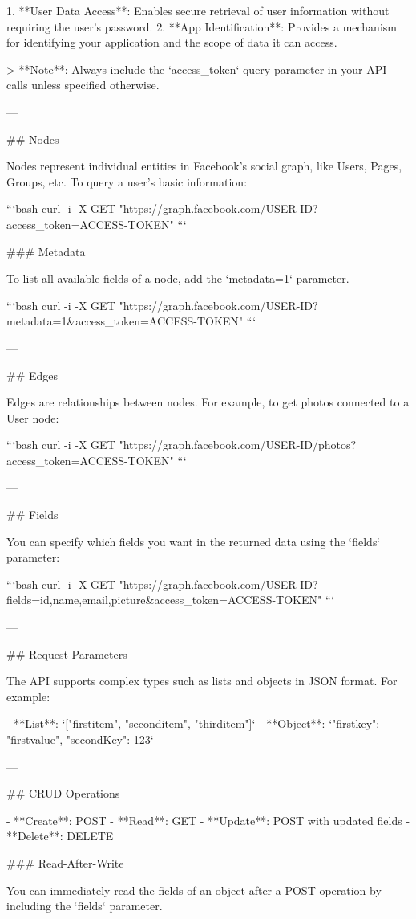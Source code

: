 1. **User Data Access**: Enables secure retrieval of user information without requiring the user's password.
2. **App Identification**: Provides a mechanism for identifying your application and the scope of data it can access.

> **Note**: Always include the `access_token` query parameter in your API calls unless specified otherwise.

---

## Nodes

Nodes represent individual entities in Facebook's social graph, like Users, Pages, Groups, etc. To query a user's basic information:

```bash
curl -i -X GET "https://graph.facebook.com/USER-ID?access_token=ACCESS-TOKEN"
```

### Metadata

To list all available fields of a node, add the `metadata=1` parameter.

```bash
curl -i -X GET "https://graph.facebook.com/USER-ID?metadata=1&access_token=ACCESS-TOKEN"
```

---

## Edges

Edges are relationships between nodes. For example, to get photos connected to a User node:

```bash
curl -i -X GET "https://graph.facebook.com/USER-ID/photos?access_token=ACCESS-TOKEN"
```

---

## Fields

You can specify which fields you want in the returned data using the `fields` parameter:

```bash
curl -i -X GET "https://graph.facebook.com/USER-ID?fields=id,name,email,picture&access_token=ACCESS-TOKEN"
```

---

## Request Parameters

The API supports complex types such as lists and objects in JSON format. For example:

- **List**: `["firstitem", "seconditem", "thirditem"]`
- **Object**: `{"firstkey": "firstvalue", "secondKey": 123}`

---

## CRUD Operations

- **Create**: POST
- **Read**: GET
- **Update**: POST with updated fields
- **Delete**: DELETE

### Read-After-Write

You can immediately read the fields of an object after a POST operation by including the `fields` parameter.

